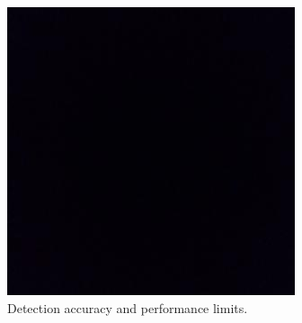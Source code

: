 \documentclass[12pt, letterpaper]{article}
\begin{document}
\begin{figure}[htb]
\center
\includegraphics{bbox.jpeg}
\caption{Detection accuracy and performance limits.}
\label{fig:limit}
\end{figure}

\vspace{.6in}




\end{document}
